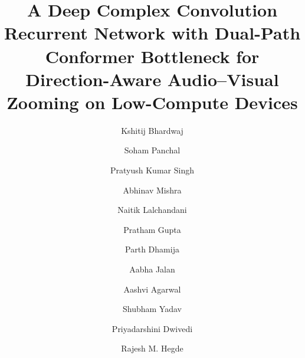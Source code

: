 \documentclass[journal,10pt]{IEEEtran}
\begin{document}
\title{A Deep Complex Convolution Recurrent Network with Dual-Path Conformer Bottleneck for Direction-Aware Audio--Visual Zooming on Low-Compute Devices}

\renewcommand\Affilfont{\fontsize{8}{9}\itshape}
\renewcommand\Authsep{, }
\renewcommand\Authand{, }
\renewcommand\Authands{, }
\setlength{\affilsep}{0.6em}

\author[1]{Kshitij Bhardwaj}
\author[2]{Soham Panchal}
\author[2]{Pratyush Kumar Singh}
\author[2]{Abhinav Mishra}
\author[3]{Naitik Lalchandani}
\author[2]{Pratham Gupta}
\author[2]{Parth Dhamija}
\author[2]{Aabha Jalan}
\author[2]{Aashvi Agarwal}
\author[1]{Shubham Yadav}
\author[2]{Priyadarshini Dwivedi}
\author[2]{Rajesh M. Hegde}


\maketitle
\end{document}
